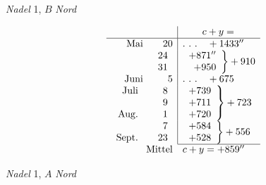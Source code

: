 \begin{center}\textit{Nadel} 1, $B$ \textit{Nord}\end{center}
\[
\begin{array}{rr|l}
&&\qquad c+y=\\\hline
\text{Mai}&20&.\ .\ .\quad+1433''\\
&\begin{array}{r}24\\31\end{array}&\left.\begin{array}{r}+871''\\+950\end{array}\right\}+910\\
\text{Juni}&5&.\ .\ .\quad+675\\
\begin{array}{r}\text{Juli}\\\phantom{\text{Juli}}\\\text{Aug.}\end{array}&\begin{array}{r}8\\9\\1\end{array}&\left.\begin{array}{r}+739\\+711\\+720\end{array}\right\}+723\\
\begin{array}{r}\phantom{\text{Aug.}}\\\text{Sept.}\end{array}&\begin{array}{r}7\\23\end{array}&\left.\begin{array}{r}+584\\+528\end{array}\right\}+556\\\cline{3-3}
\multicolumn{2}{r}{\text{Mittel}}&c+y=+859''
\end{array}
\]
\begin{center}\textit{Nadel} 1, $A$ \textit{Nord}\end{center}
